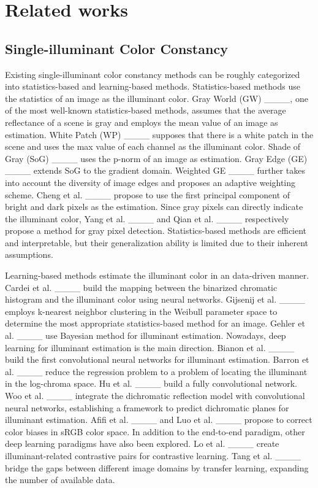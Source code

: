 \section{Related works}
\label{sec2:related works}

\subsection{Single-illuminant Color Constancy}
\label{sec2.1:Single-illuminant Color Constancy}
Existing single-illuminant color constancy methods can be roughly categorized into statistics-based and learning-based methods. Statistics-based methods use the statistics of an image as the illuminant color. Gray World (GW) ____, one of the most well-known statistics-based methods, assumes that the average reflectance of a scene is gray and employs the mean value of an image as estimation. White Patch (WP) ____ supposes that there is a white patch in the scene and uses the max value of each channel as the illuminant color. Shade of Gray (SoG) ____ uses the p-norm of an image as estimation. Gray Edge (GE) ____ extends SoG
to the gradient domain. Weighted GE ____ further takes into account the diversity of image edges and proposes an adaptive weighting scheme. Cheng et al. ____ propose to use the first principal component of bright and dark pixels as the estimation. Since gray pixels can directly indicate the illuminant color, Yang et al. ____ and Qian et al. ____ respectively propose a method for gray pixel detection. Statistics-based methods are efficient and interpretable, but their generalization ability is limited due to their inherent assumptions.

Learning-based methods estimate the illuminant color in an data-driven manner. Cardei et al. ____ build the mapping between the binarized chromatic histogram and the illuminant color using neural networks. Gijsenij et al. ____ employs k-nearest neighbor clustering in the Weibull parameter space to determine the most appropriate statistics-based method for an image. Gehler et al. ____ use Bayesian method for illuminant estimation. Nowadays, deep learning for illuminant estimation is the main direction. Bianon et al. ____ build the first convolutional neural networks for illuminant estimation. Barron et al. ____ reduce the regression problem to a problem of locating the illuminant in the log-chroma space. Hu et al. ____ build a fully convolutional network. Woo et al. ____ integrate the dichromatic reflection model with convolutional neural networks, establishing a framework to predict dichromatic planes for illuminant estimation. Afifi et al. ____ and Luo et al. ____ propose to correct color biases in sRGB color space. In addition to the end-to-end paradigm, other deep learning paradigms have also been explored. Lo et al. ____ create illuminant-related contrastive pairs for contrastive learning. Tang et al. ____ bridge the gaps between different image domains by transfer learning, expanding the number of available data.

